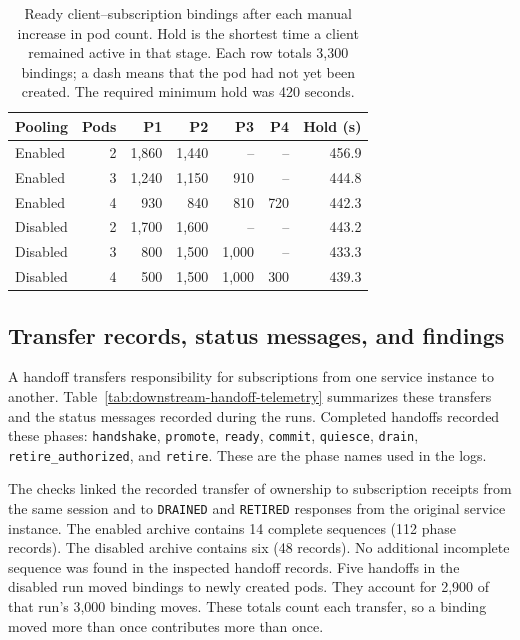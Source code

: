 \documentclass[10pt,a4paper]{article}
\begin{document}
\begin{table}[htbp]
\centering
\footnotesize
\setlength{\tabcolsep}{3pt}
\caption{Ready client--subscription bindings after each manual increase in pod count. Hold is the shortest time a client remained active in that stage. Each row totals 3,300 bindings; a dash means that the pod had not yet been created. The required minimum hold was 420 seconds.}
\label{tab:downstream-binding-distribution}
\begin{tabular}{@{}lrrrrrr@{}}
\toprule
Pooling & Pods & P1 & P2 & P3 & P4 & Hold (s) \\
\midrule
Enabled & 2 & 1,860 & 1,440 & -- & -- & 456.9 \\
Enabled & 3 & 1,240 & 1,150 & 910 & -- & 444.8 \\
Enabled & 4 & 930 & 840 & 810 & 720 & 442.3 \\
\addlinespace
Disabled & 2 & 1,700 & 1,600 & -- & -- & 443.2 \\
Disabled & 3 & 800 & 1,500 & 1,000 & -- & 433.3 \\
Disabled & 4 & 500 & 1,500 & 1,000 & 300 & 439.3 \\
\bottomrule
\end{tabular}
\end{table}

\subsection{Transfer records, status messages, and findings}
A handoff transfers responsibility for subscriptions from one service instance to another. Table~\ref{tab:downstream-handoff-telemetry} summarizes these transfers and the status messages recorded during the runs. Completed handoffs recorded these phases: \texttt{handshake}, \texttt{promote}, \texttt{ready}, \texttt{commit}, \texttt{quiesce}, \texttt{drain}, \texttt{retire\_\allowbreak{}authorized}, and \texttt{retire}. These are the phase names used in the logs.

The checks linked the recorded transfer of ownership to subscription receipts from the same session and to \texttt{DRAINED} and \texttt{RETIRED} responses from the original service instance. The enabled archive contains 14 complete sequences (112 phase records). The disabled archive contains six (48 records). No additional incomplete sequence was found in the inspected handoff records. Five handoffs in the disabled run moved bindings to newly created pods. They account for 2,900 of that run's 3,000 binding moves. These totals count each transfer, so a binding moved more than once contributes more than once.
\end{document}
